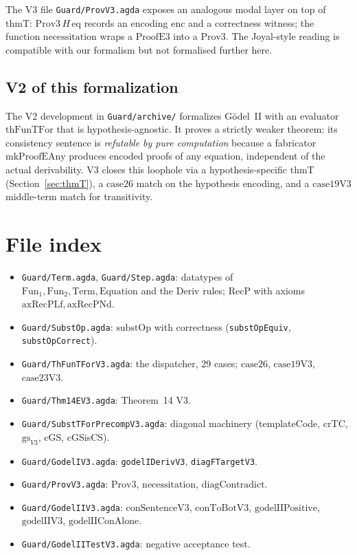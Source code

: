 \documentclass[11pt]{article}
\newcommand{\thmT}{\mathrm{thmT}}
\newcommand{\substOp}{\mathrm{substOp}}
\newcommand{\RecP}{\mathrm{RecP}}
\begin{document}
The V3 file \verb|Guard/ProvV3.agda| exposes an analogous modal
layer on top of $\thmT$: $\mathrm{Prov3}\,H\,\mathrm{eq}$ records
an encoding $\mathrm{enc}$ and a correctness witness; the function
$\mathrm{necessitation}$ wraps a $\mathrm{ProofE3}$ into a
$\mathrm{Prov3}$.  The Joyal-style reading is compatible with our
formalism but not formalised further here.

\subsection{V2 of this formalization}

The V2 development in \verb|Guard/archive/| formalizes G\"odel~II
with an evaluator $\mathrm{thFunTFor}$ that is
hypothesis-agnostic.  It proves a strictly weaker theorem: its
consistency sentence is \emph{refutable by pure computation}
because a fabricator $\mathrm{mkProofEAny}$ produces encoded proofs
of any equation, independent of the actual derivability.  V3
closes this loophole via a hypothesis-specific $\thmT$
(Section~\ref{sec:thmT}), a $\mathrm{case26}$ match on the
hypothesis encoding, and a $\mathrm{case19V3}$ middle-term match
for transitivity.

\section{File index}

\begin{itemize}
\item \verb|Guard/Term.agda|, \verb|Guard/Step.agda|:
  datatypes of $\mathrm{Fun}_1, \mathrm{Fun}_2, \mathrm{Term},
  \mathrm{Equation}$ and the $\mathrm{Deriv}$ rules;
  $\RecP$ with axioms $\mathrm{axRecPLf}, \mathrm{axRecPNd}$.
\item \verb|Guard/SubstOp.agda|: $\substOp$ with correctness
  (\texttt{substOpEquiv}, \texttt{substOpCorrect}).
\item \verb|Guard/ThFunTForV3.agda|: the dispatcher, 29 cases;
  $\mathrm{case26}$, $\mathrm{case19V3}$, $\mathrm{case23V3}$.
\item \verb|Guard/Thm14EV3.agda|: Theorem~14 V3.
\item \verb|Guard/SubstTForPrecompV3.agda|: diagonal machinery
  (templateCode, crTC, $\mathrm{gs}_{V3}$, cGS, cGSisCS).
\item \verb|Guard/GodelIV3.agda|: \texttt{godelIDerivV3},
  \texttt{diagFTargetV3}.
\item \verb|Guard/ProvV3.agda|: $\mathrm{Prov3}$,
  $\mathrm{necessitation}$, $\mathrm{diagContradict}$.
\item \verb|Guard/GodelIIV3.agda|: $\mathrm{conSentenceV3}$,
  $\mathrm{conToBotV3}$, $\mathrm{godelIIPositive}$,
  $\mathrm{godelIIV3}$, $\mathrm{godelIIConAlone}$.
\item \verb|Guard/GodelIITestV3.agda|: negative acceptance test.
\end{itemize}
\end{document}
